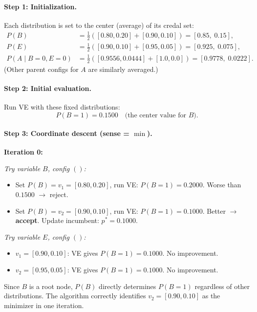 \documentclass{article}
\begin{document}
\paragraph{Step 1: Initialization.}
Each distribution is set to the center (average) of its credal set:
\begin{align*}
  P(B) &= \tfrac{1}{2}([0.80, 0.20] + [0.90, 0.10]) = [0.85,\; 0.15], \\
  P(E) &= \tfrac{1}{2}([0.90, 0.10] + [0.95, 0.05]) = [0.925,\; 0.075], \\
  P(A \mid B{=}0, E{=}0) &= \tfrac{1}{2}([0.9556, 0.0444] + [1.0, 0.0]) = [0.9778,\; 0.0222].
\end{align*}
(Other parent configs for $A$ are similarly averaged.)

\paragraph{Step 2: Initial evaluation.}
Run VE with these fixed distributions:
\[
  P(B{=}1) = 0.1500 \quad \text{(the center value for $B$).}
\]

\paragraph{Step 3: Coordinate descent (sense = $\min$).}

\textbf{Iteration 0:}

\emph{Try variable $B$, config $()$:}
\begin{itemize}
  \item Set $P(B) = v_1 = [0.80, 0.20]$, run VE: $P(B{=}1) = 0.2000$.
        Worse than $0.1500$ $\to$ reject.
  \item Set $P(B) = v_2 = [0.90, 0.10]$, run VE: $P(B{=}1) = 0.1000$.
        Better $\to$ \textbf{accept}. Update incumbent: $p^* = 0.1000$.
\end{itemize}

\emph{Try variable $E$, config $()$:}
\begin{itemize}
  \item $v_1 = [0.90, 0.10]$: VE gives $P(B{=}1) = 0.1000$. No improvement.
  \item $v_2 = [0.95, 0.05]$: VE gives $P(B{=}1) = 0.1000$. No improvement.
\end{itemize}

Since $B$ is a root node, $P(B)$ directly determines $P(B{=}1)$ regardless of
other distributions. The algorithm correctly identifies $v_2 = [0.90, 0.10]$ as the
minimizer in one iteration.
\end{document}
